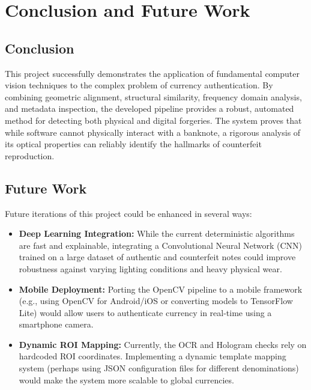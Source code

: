 \documentclass[12pt,a4paper]{article}
\begin{document}
\newpage

\section{Conclusion and Future Work}

\subsection{Conclusion}
This project successfully demonstrates the application of fundamental computer vision techniques to the complex problem of currency authentication. By combining geometric alignment, structural similarity, frequency domain analysis, and metadata inspection, the developed pipeline provides a robust, automated method for detecting both physical and digital forgeries. The system proves that while software cannot physically interact with a banknote, a rigorous analysis of its optical properties can reliably identify the hallmarks of counterfeit reproduction.

\subsection{Future Work}
Future iterations of this project could be enhanced in several ways:
\begin{itemize}
    \item \textbf{Deep Learning Integration:} While the current deterministic algorithms are fast and explainable, integrating a Convolutional Neural Network (CNN) trained on a large dataset of authentic and counterfeit notes could improve robustness against varying lighting conditions and heavy physical wear.
    \item \textbf{Mobile Deployment:} Porting the OpenCV pipeline to a mobile framework (e.g., using OpenCV for Android/iOS or converting models to TensorFlow Lite) would allow users to authenticate currency in real-time using a smartphone camera.
    \item \textbf{Dynamic ROI Mapping:} Currently, the OCR and Hologram checks rely on hardcoded ROI coordinates. Implementing a dynamic template mapping system (perhaps using JSON configuration files for different denominations) would make the system more scalable to global currencies.
\end{itemize}

\newpage
\end{document}
